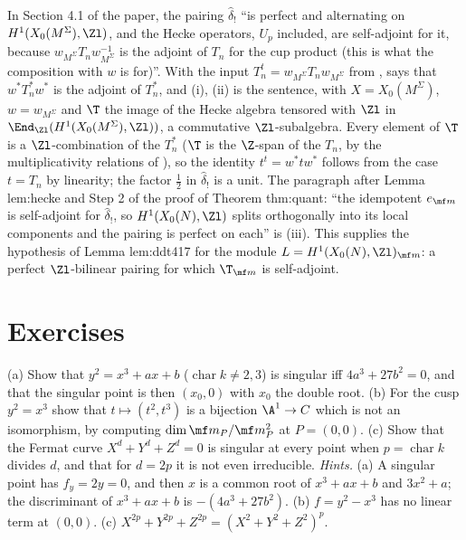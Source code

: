 \begin{paperlink}\label{pl:curves:hecke}
In Section 4.1 of the paper, the pairing $\hat\delta_!$ ``is perfect and alternating on $H^1(X_0(M^\Sigma),\Zl)$, and the Hecke operators, $U_p$ included, are self-adjoint for it, because
$w_{M^\Sigma}T_nw_{M^\Sigma}^{-1}$ is the adjoint of $T_n$ for the cup product (this is what the composition with $w$ is for)''. With the input
$T_n^t=w_{M^\Sigma}T_nw_{M^\Sigma}$ from
,  says that $w^*T_n^*w^*$ is the adjoint of $T_n^*$, and (i), (ii) is the sentence, with $X=X_0(M^\Sigma)$,
$w=w_{M^\Sigma}$ and $\T$ the image of the Hecke algebra tensored with $\Zl$ in $\End_{\Zl}(H^1(X_0(M^\Sigma),\Zl))$, a commutative $\Zl$-subalgebra. Every element of
$\T$ is a $\Zl$-combination of the $T_n^*$ ($\T$ is the $\Z$-span of the $T_n$, by the multiplicativity relations of ), so the identity $t^t=w^*tw^*$
follows from the case $t=T_n$ by linearity; the factor $\frac12$ in $\hat\delta_!$ is a unit. The paragraph after Lemma lem:hecke and Step 2 of the proof of Theorem thm:quant:
``the idempotent $e_{\mf m}$ is self-adjoint for $\hat\delta_!$, so $H^1(X_0(N),\Zl)$ splits orthogonally into its local components and the pairing is perfect on each'' is
(iii). This supplies the hypothesis of Lemma lem:ddt417 for the module $L=H^1(X_0(N),\Zl)_{\mf m}$:
a perfect $\Zl$-bilinear pairing for which $\T_{\mf m}$ is self-adjoint.
\end{paperlink}

\section{Exercises}\label{sec:curves:exercises}

\begin{exercise}\label{ex:curves:ex-singular}
(a) Show that $y^2=x^3+ax+b$ ($\operatorname{char}k\ne2,3$) is singular iff $4a^3+27b^2=0$, and that the singular point is then $(x_0,0)$ with $x_0$ the double root. (b) For the cusp
$y^2=x^3$ show that $t\mapsto(t^2,t^3)$ is a bijection $\A^1\to C$ which is not an isomorphism, by computing $\dim\mf m_P/\mf m_P^2$ at $P=(0,0)$. (c) Show that the Fermat curve
$X^d+Y^d+Z^d=0$ is singular at every point when $p=\operatorname{char}k$ divides $d$, and that for $d=2p$ it is not even irreducible.
\emph{Hints.} (a) A singular point has $f_y=2y=0$, and then $x$ is a common root of $x^3+ax+b$ and $3x^2+a$; the discriminant of $x^3+ax+b$ is $-(4a^3+27b^2)$.
(b) $f=y^2-x^3$ has no linear term at $(0,0)$. (c) $X^{2p}+Y^{2p}+Z^{2p}=(X^2+Y^2+Z^2)^p$.
\end{exercise}

